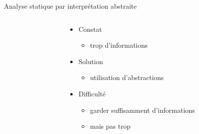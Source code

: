 \begin{frame}{Analyse statique par interprétation abstraite}
\begin{columns}
\begin{column}{0.3\textwidth}
\begin{center}
      \end{center}
    \end{column}
    \begin{column}{0.5\textwidth}
      \begin{block}{}
        \begin{itemize}
        \item Constat
          \begin{itemize}
          \item trop d'informations
          \end{itemize}
        \item Solution
          \begin{itemize}
          \item utilisation d'abstractions
          \end{itemize}
        \item Difficulté
          \begin{itemize}
          \item garder suffisamment d'informations
          \item mais pas trop
          \end{itemize}
        \end{itemize}
      \end{block}
    \end{column}
  \end{columns}
\end{frame}

